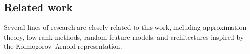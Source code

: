 \documentclass[review,hidelinks,onefignum,onetabnum]{siamart250211}
\begin{document}




\subsection{Related work}
\label{sec:related:work}
Several lines of research are closely related to this work, including approximation theory, low-rank methods, random feature models, and architectures inspired by the Kolmogorov–Arnold representation.
\end{document}
